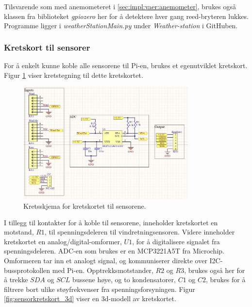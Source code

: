 Tilsvarende som med anemometeret i \autoref{sec:impl:vaer:anemometer}, brukes også klassen  fra biblioteket \textit{gpiozero} her for å detektere hver gang reed-bryteren lukkes. Programme ligger i \textit{weatherStationMain.py} under \textit{Weather-station} i GitHuben\cite{GitHub}.

\subsubsection{Kretskort til sensorer}\label{sec:impl:vaer:kretskort}


For å enkelt kunne koble alle sensorene til Pi-en, brukes et egenutviklet kretskort.
Figur \ref{fig:sensorkretskort_krets} viser kretstegning til dette kretskortet.

\begin{figure}[H]
    \centering
    \includegraphics[width=0.8\textwidth]{implementering/sensorkretskort_krets.png}
    \caption{Kretsskjema for kretskortet til sensorene.}
    \label{fig:sensorkretskort_krets}
\end{figure}

I tillegg til kontakter for å koble til sensorene, inneholder kretskortet en motstand, $R1$, til spenningsdeleren til vindretningsensoren. 
Videre inneholder kretskortet en analog/digital-omformer, $U1$, for å digitalisere signalet fra spenningsdeleren. 
ADC-en som brukes er en MCP3221A5T fra Microchip\cite{adc}. 
Omformeren tar inn et analogt signal, og kommuniserer direkte over I2C-bussprotokollen med Pi-en. 
Opptrekksmotstander, $R2$ og $R3$, brukes også her for å trekke $SDA$ og $SCL$ bussene høye, og to kondensatorer, $C1$ og $C2$, brukes for å filtrere bort ulike støyfrekvenser fra spenningsforsyningen. Figur \ref{fig:sensorkretskort_3d} viser en 3d-modell av kretskortet.

